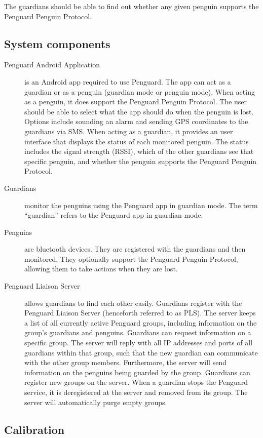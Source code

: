 \documentclass{report}
\begin{document}
The guardians should be able to find out whether any given penguin supports the Penguard Penguin Protocol.

\subsection{System components}

\begin{description}
    \item [Penguard Android Application] is an Android app required to use Penguard. The app can act as a guardian or as a penguin (guardian mode or penguin mode). When acting as a penguin, it does support the Penguard Penguin Protocol. The user should be able to select what the app should do when the penguin is lost. Options include sounding an alarm and sending GPS coordinates to the guardians via SMS. When acting as a guardian, it provides an user interface that displays the status of each monitored penguin. The status includes the signal strength (RSSI), which of the other guardians see that specific penguin, and whether the penguin supports the Penguard Penguin Protocol.
    \item [Guardians] monitor the penguins using the Penguard app in guardian mode. The term ``guardian'' refers to the Penguard app in guardian mode.
    \item [Penguins] are bluetooth devices. They are registered with the guardians and then monitored. They optionally support the Penguard Penguin Protocol, allowing them to take actions when they are lost.
    \item [Penguard Liaison Server] allows guardians to find each other easily. Guardians register with the Penguard Liaison Server (henceforth referred to as PLS). The server keeps a list of all currently active Penguard groups, including information on the group's guardians and penguins. Guardians can request information on a specific group. The server will reply with all IP addresses and ports of all guardians within that group, such that the new guardian can communicate with the other group members. Furthermore, the server will send information on the penguins being guarded by the group. Guardians can register new groups on the server. When a guardian stops the Penguard service, it is deregistered at the server and removed from its group. The server will automatically purge empty groups. 
\end{description}

\subsection{Calibration}
\end{document}
